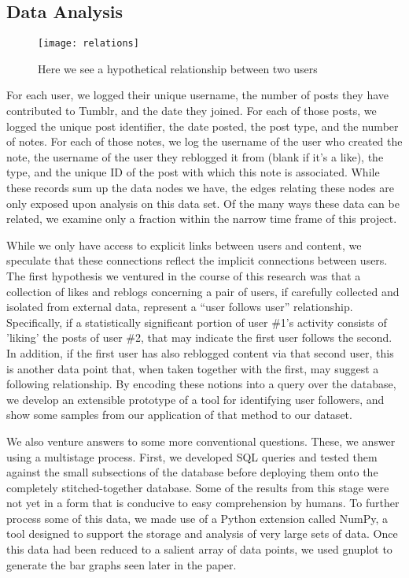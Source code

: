\subsection{Data Analysis}
\begin{figure*}
\centering
\texttt{[image: relations]}
 \caption{Here we see a hypothetical relationship between two users}
 \label{fig:relations}
\end{figure*}
For each user, we logged their unique username, the number of posts 
they have contributed to Tumblr, and the date they joined. 
For each of those posts, we logged the unique post identifier, the 
date posted, the post type, and the number of notes.
For each of those notes, we log the username of the user who created 
the note, the username of the user they reblogged it from (blank if 
it's a like), the type, and the unique ID of the post with which this 
note is associated.  While these records sum up the data nodes we have, 
the edges relating these nodes are only exposed upon analysis on this 
data set.  Of the many ways these data can be related, we examine only 
a fraction within the narrow time frame of this project.

While we only have access to explicit links between users and content, 
we speculate that these connections reflect the implicit connections 
between users.  The first hypothesis we ventured in the course of this 
research was that a collection of likes and reblogs concerning a pair 
of users, if carefully collected and isolated from external data, 
represent a ``user follows user'' relationship.  Specifically, if a 
statistically significant portion of user \#1's activity consists of 
'liking' the posts of user \#2, that may indicate the first user 
follows the second.  In addition, if the first user has also reblogged 
content via that second user, this is another data point that, when 
taken together with the first, may suggest a following relationship.  
By encoding these notions into a query over the database, we
develop an extensible prototype of a tool for identifying user followers,
and show some samples from our application of that method
to our dataset.


We also venture answers to some more conventional questions.  These, 
we answer using a multistage process.  First, we developed SQL queries 
and tested them against the small subsections of the database before 
deploying them onto the completely stitched-together database.  Some 
of the results from this stage were not yet in a form that is conducive 
to easy comprehension by humans.  To further process some of this data, 
we made use of a Python extension called NumPy, a tool designed to 
support the storage and analysis of very large sets of data.  Once 
this data had been reduced to a salient array of data points, we used 
gnuplot to generate the bar graphs seen later in the paper.


